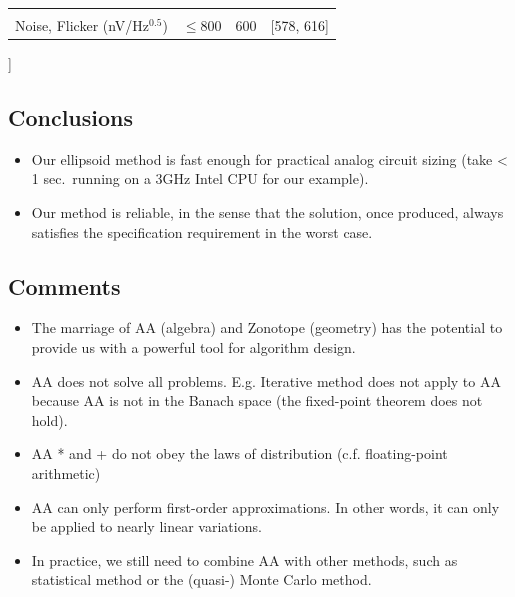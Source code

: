 \documentclass[
]{article}
\providecommand{\tightlist}{%
  \setlength{\itemsep}{0pt}\setlength{\parskip}{0pt}}
\begin{document}
\begin{longtable}[]{@{}llll@{}}
\begin{minipage}[t]{0.16\columnwidth}
\end{minipage}\tabularnewline
\begin{minipage}[t]{0.40\columnwidth}\raggedright
Noise, Flicker (nV/Hz\(^{0.5}\))\strut
\end{minipage} & \begin{minipage}[t]{0.16\columnwidth}\raggedright
\(\leq 800\)\strut
\end{minipage} & \begin{minipage}[t]{0.16\columnwidth}\raggedright
\(600\)\strut
\end{minipage} & \begin{minipage}[t]{0.16\columnwidth}\raggedright
{[}578, 616{]}\strut
\end{minipage}\tabularnewline
\bottomrule
\end{longtable}

{]}

\hypertarget{conclusions}{%
\subsection{Conclusions}\label{conclusions}}

\begin{itemize}
\tightlist
\item
  Our ellipsoid method is fast enough for practical analog circuit
  sizing (take \textless{} 1 sec.~running on a 3GHz Intel CPU for our example).
\item
  Our method is reliable, in the sense that the solution, once
  produced, always satisfies the specification requirement in the
  worst case.
\end{itemize}

\hypertarget{comments}{%
\subsection{Comments}\label{comments}}

\begin{itemize}
\tightlist
\item
  The marriage of AA (algebra) and Zonotope (geometry) has the potential to provide us with a powerful tool for algorithm design.
\item
  AA does not solve all problems. E.g. Iterative method does not apply to AA because AA is not in the Banach space (the fixed-point theorem does not hold).
\item
  AA * and + do not obey the laws of distribution (c.f. floating-point arithmetic)
\item
  AA can only perform first-order approximations. In other words, it can only be applied to nearly linear variations.
\item
  In practice, we still need to combine AA with other methods, such as statistical method or the (quasi-) Monte Carlo method.
\end{itemize}
\end{document}
